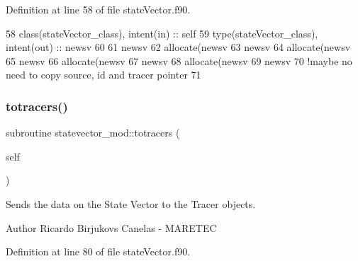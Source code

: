 Definition at line 58 of file state\+Vector.\+f90.


\begin{DoxyCode}
58     \textcolor{keywordtype}{class}(stateVector\_class), \textcolor{keywordtype}{intent(in)} :: self
59     \textcolor{keywordtype}{type}(stateVector\_class), \textcolor{keywordtype}{intent(out)} :: newsv
60     
61     newsv%
62     \textcolor{keyword}{allocate}(newsv%
63     newsv%
64     \textcolor{keyword}{allocate}(newsv%
65     newsv%
66     \textcolor{keyword}{allocate}(newsv%
67     newsv%
68     \textcolor{keyword}{allocate}(newsv%
69     newsv%
70     \textcolor{comment}{!maybe no need to copy source, id and tracer pointer}
71     
\end{DoxyCode}
\mbox{\label{namespacestatevector__mod_af0831dbae02e8ec94c576224cae673e5}} 
\subsubsection{\texorpdfstring{totracers()}{totracers()}}
{\footnotesize\ttfamily subroutine statevector\+\_\+mod\+::totracers (\begin{DoxyParamCaption}\item[{class(\mbox{\hyperlink{structstatevector__mod_1_1statevector__class}{statevector\+\_\+class}}), intent(in)}]{self }\end{DoxyParamCaption})\hspace{0.3cm}{\ttfamily [private]}}



Sends the data on the State Vector to the Tracer objects. 

\begin{DoxyAuthor}{Author}
Ricardo Birjukovs Canelas -\/ M\+A\+R\+E\+T\+EC 
\end{DoxyAuthor}


Definition at line 80 of file state\+Vector.\+f90.


